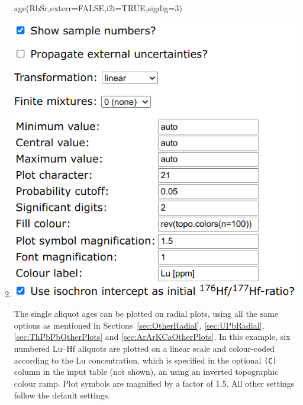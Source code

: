 \begin{refsection}
\begin{enumerate}
\begin{console}
age(RbSr,exterr=FALSE,i2i=TRUE,sigdig=3)
\end{console}

\item\noindent\begin{minipage}[t]{.55\linewidth}
\strut\vspace*{-\baselineskip}\newline
\includegraphics[width=\linewidth]{../figures/LuHfRadial.png}
\end{minipage}
\begin{minipage}[t]{.45\linewidth}
  The single aliquot ages can be plotted on radial plots, using all
  the same options as mentioned in Sections~\ref{sec:OtherRadial},
  \ref{sec:UPbRadial}, \ref{sec:ThPbPbOtherPlots} and
  \ref{sec:ArArKCaOtherPlots}. In this example, six numbered Lu--Hf
  aliquots are plotted on a linear scale and colour-coded according to
  the Lu concentration, which is specified in the optional
  \texttt{(C)} column in the input table (not shown), an using an
  inverted topographic colour ramp.  Plot symbols are magnified by a
  factor of 1.5. All other settings follow the default settings.
\end{minipage}


\end{enumerate}

\printbibliography[heading=subbibliography]

\end{refsection}
